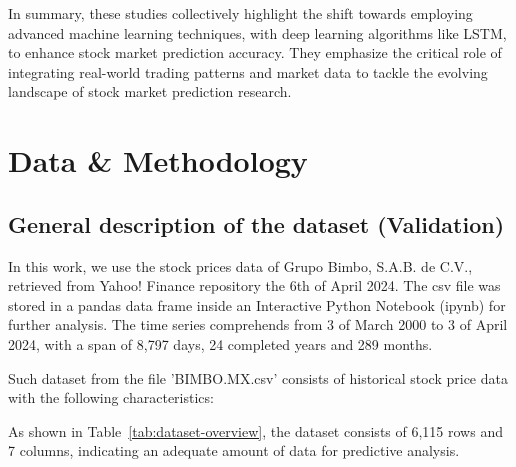 \documentclass[conference]{IEEEtran}
\begin{document}
In summary, these studies collectively highlight the shift towards employing advanced machine learning techniques, with deep learning algorithms like LSTM, to enhance stock market prediction accuracy. They emphasize the critical role of integrating real-world trading patterns and market data to tackle the evolving landscape of stock market prediction research.
 

\section{Data \& Methodology}
\subsection{General description of the dataset (Validation)}
In this work, we use the stock prices data of Grupo Bimbo, S.A.B. de C.V., retrieved from Yahoo! Finance repository the 6th of April 2024. The csv file was stored in a pandas data frame inside an Interactive Python Notebook (ipynb) for further analysis. The time series comprehends from 3 of March 2000 to 3 of April 2024, with a span of 8,797 days, 24 completed years and 289 months.

Such dataset from the file 'BIMBO.MX.csv' consists of historical stock price data with the following characteristics:

\begin{table}[h]
\caption{Overview of the dataset's structure}\label{tab:dataset-overview}
\end{table}

As shown in Table~\ref{tab:dataset-overview}, the dataset consists of 6,115 rows and 7 columns, indicating an adequate amount of data for predictive analysis.
\end{document}
